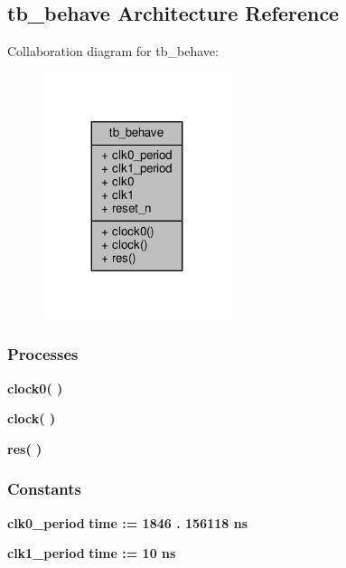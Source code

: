 \subsection{tb\+\_\+behave Architecture Reference}
\label{classrx__path__tb_1_1tb__behave}


Collaboration diagram for tb\+\_\+behave\+:\nopagebreak
\begin{figure}[H]
\begin{center}
\leavevmode
\includegraphics[width=155pt]{d5/dd5/classrx__path__tb_1_1tb__behave__coll__graph}
\end{center}
\end{figure}
\subsubsection*{Processes}
 \begin{DoxyCompactItemize}
\item 
{\bf clock0}{\bfseries  (  )}
\item 
{\bf clock}{\bfseries  (  )}
\item 
{\bf res}{\bfseries  (  )}
\end{DoxyCompactItemize}
\subsubsection*{Constants}
 \begin{DoxyCompactItemize}
\item 
{\bf clk0\+\_\+period} {\bfseries \textcolor{comment}{time}\textcolor{vhdlchar}{ }\textcolor{vhdlchar}{ }\textcolor{vhdlchar}{\+:}\textcolor{vhdlchar}{=}\textcolor{vhdlchar}{ }\textcolor{vhdlchar}{ }\textcolor{vhdlchar}{ } \textcolor{vhdldigit}{1846} \textcolor{vhdlchar}{.} \textcolor{vhdldigit}{156118} \textcolor{vhdlchar}{ }\textcolor{vhdlchar}{ns}\textcolor{vhdlchar}{ }} 
\item 
{\bf clk1\+\_\+period} {\bfseries \textcolor{comment}{time}\textcolor{vhdlchar}{ }\textcolor{vhdlchar}{ }\textcolor{vhdlchar}{\+:}\textcolor{vhdlchar}{=}\textcolor{vhdlchar}{ }\textcolor{vhdlchar}{ }\textcolor{vhdlchar}{ } \textcolor{vhdldigit}{10} \textcolor{vhdlchar}{ }\textcolor{vhdlchar}{ns}\textcolor{vhdlchar}{ }} 
\end{DoxyCompactItemize}
